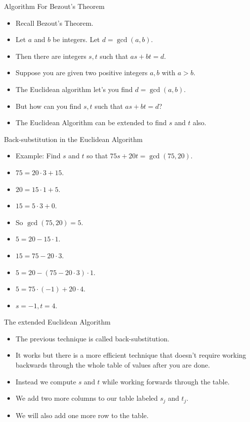 \documentclass{beamer}
\begin{document}
\begin{frame}{Algorithm For Bezout's Theorem}

\begin{itemize}
\item Recall Bezout's Theorem.
\item Let $a$ and $b$ be integers. Let $d=\gcd(a,b)$.
\item Then there are integers $s,t$ such that $as +bt = d$.
\item Suppose you are given two positive integers $a, b$ with $a>b$.
\item The Euclidean algorithm let's you find $d=\gcd(a,b)$.
\item But how can you find $s,t$ such that $as +bt = d$?
\item The Euclidean Algorithm can be extended to find $s$ and $t$ also.
\end{itemize}

\end{frame}

\begin{frame}{Back-substitution in the Euclidean Algorithm}

\begin{itemize}
  \item Example: Find $s$ and $t$ so that $75s+20t = \gcd(75, 20)$.
  \item $75 = 20\cdot 3 + 15$.
  \item $20 = 15 \cdot 1 + 5$.
  \item $15 = 5 \cdot 3 + 0$.
  \item So $\gcd(75, 20) = 5$.
  \item $5= 20 - 15 \cdot 1$.
  \item $15 = 75 -20 \cdot 3$.
  \item $5=20 - (75 - 20\cdot 3) \cdot 1$.
  \item $5 = 75 \cdot (-1) + 20 \cdot 4$.
  \item $s=-1, t=4$.
\end{itemize}

\end{frame}

\begin{frame}{The extended Euclidean Algorithm}

\begin{itemize}
  \item The previous technique is called back-substitution.
  \item It works but there is a more efficient technique that doesn't require
  working backwards through the whole table of values after you are done.
  \item Instead we compute $s$ and $t$ while working forwards through the table.
  \item We add two more columns to our table labeled $s_j$ and $t_j$.
  \item We will also add one more row to the table.
\end{itemize}

\end{frame}
\end{document}

